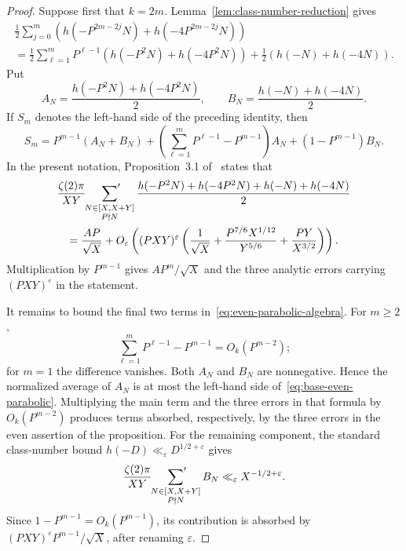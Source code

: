 \documentclass[12pt,reqno]{amsart}
\numberwithin{equation}{section}
\theoremstyle{plain}
\theoremstyle{definition}
\theoremstyle{remark}
\begin{document}
\begin{proof}
Suppose first that $k=2m$.
Lemma~\ref{lem:class-number-reduction} gives
\begin{multline*}
\frac12
\sum_{j=0}^{m}
\left(
h(-P^{2m-2j}N)+h(-4P^{2m-2j}N)
\right)
\\
=
\frac12
\sum_{\ell=1}^{m}P^{\ell-1}
\left(
h(-P^2N)+h(-4P^2N)
\right)
+
\frac12\left(h(-N)+h(-4N)\right).
\end{multline*}
Put
\[
A_N=\frac{h(-P^2N)+h(-4P^2N)}2,
\qquad
B_N=\frac{h(-N)+h(-4N)}2.
\]
If $S_m$ denotes the left-hand side of the preceding identity, then
\begin{equation}\label{eq:even-parabolic-algebra}
S_m
=P^{m-1}(A_N+B_N)
+\left(\sum_{\ell=1}^{m}P^{\ell-1}-P^{m-1}\right)A_N
+(1-P^{m-1})B_N.
\end{equation}
In the present notation, Proposition~3.1 of~\cite{KunduMuller2026} states that
\begin{multline}\label{eq:base-even-parabolic}
\frac{\zeta(2)\pi}{XY}
\sideset{}{'}\sum_{\substack{N\in[X,X+Y]\\P\nmid N}}
\frac{
h(-P^2N)+h(-4P^2N)+h(-N)+h(-4N)
}{2}
\\
=
\frac{AP}{\sqrt X}
+
O_\varepsilon\left(
(PXY)^\varepsilon
\left(
\frac1{\sqrt X}
+
\frac{P^{7/6}X^{1/12}}{Y^{5/6}}
+
\frac{PY}{X^{3/2}}
\right)
\right).
\end{multline}
Multiplication by $P^{m-1}$ gives $AP^m/\sqrt X$ and the three analytic errors carrying $(PXY)^\varepsilon$ in the statement.

It remains to bound the final two terms in~\eqref{eq:even-parabolic-algebra}.
For $m\geq2$,
\[
\sum_{\ell=1}^{m}P^{\ell-1}-P^{m-1}=O_k(P^{m-2});
\]
for $m=1$ the difference vanishes.
Both $A_N$ and $B_N$ are nonnegative.  Hence the normalized average of $A_N$ is at most the left-hand side of~\eqref{eq:base-even-parabolic}.  Multiplying the main term and the three errors in that formula by $O_k(P^{m-2})$ produces terms absorbed, respectively, by the three errors in the even assertion of the proposition.  For the remaining component, the standard class-number bound $h(-D)\ll_\varepsilon D^{1/2+\varepsilon}$ gives
\[
\frac{\zeta(2)\pi}{XY}
\sideset{}{'}\sum_{\substack{N\in[X,X+Y]\\P\nmid N}} B_N
\ll_\varepsilon X^{-1/2+\varepsilon}.
\]
Since $1-P^{m-1}=O_k(P^{m-1})$, its contribution is absorbed by
$(PXY)^\varepsilon P^{m-1}/\sqrt X$, after renaming $\varepsilon$.


\end{proof}
\end{document}
